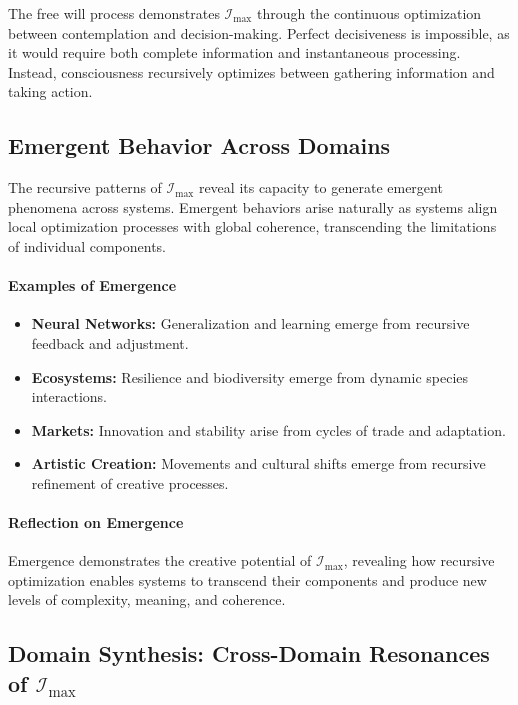 \documentclass[12pt]{article}
\begin{document}
The free will process demonstrates \(\mathcal{I}_{\text{max}}\) through the continuous optimization between contemplation and decision-making. Perfect decisiveness is impossible, as it would require both complete information and instantaneous processing. Instead, consciousness recursively optimizes between gathering information and taking action.

\subsection{Emergent Behavior Across Domains}
The recursive patterns of \(\mathcal{I}_{\text{max}}\) reveal its capacity to generate emergent phenomena across systems. Emergent behaviors arise naturally as systems align local optimization processes with global coherence, transcending the limitations of individual components.

\paragraph{Examples of Emergence}
\begin{itemize}
    \item \textbf{Neural Networks:} Generalization and learning emerge from recursive feedback and adjustment.
    \item \textbf{Ecosystems:} Resilience and biodiversity emerge from dynamic species interactions.
    \item \textbf{Markets:} Innovation and stability arise from cycles of trade and adaptation.
    \item \textbf{Artistic Creation:} Movements and cultural shifts emerge from recursive refinement of creative processes.
\end{itemize}

\paragraph{Reflection on Emergence}
Emergence demonstrates the creative potential of \(\mathcal{I}_{\text{max}}\), revealing how recursive optimization enables systems to transcend their components and produce new levels of complexity, meaning, and coherence.

\subsection{Domain Synthesis: Cross-Domain Resonances of \(\mathcal{I}_{\text{max}}\)}
\end{document}
